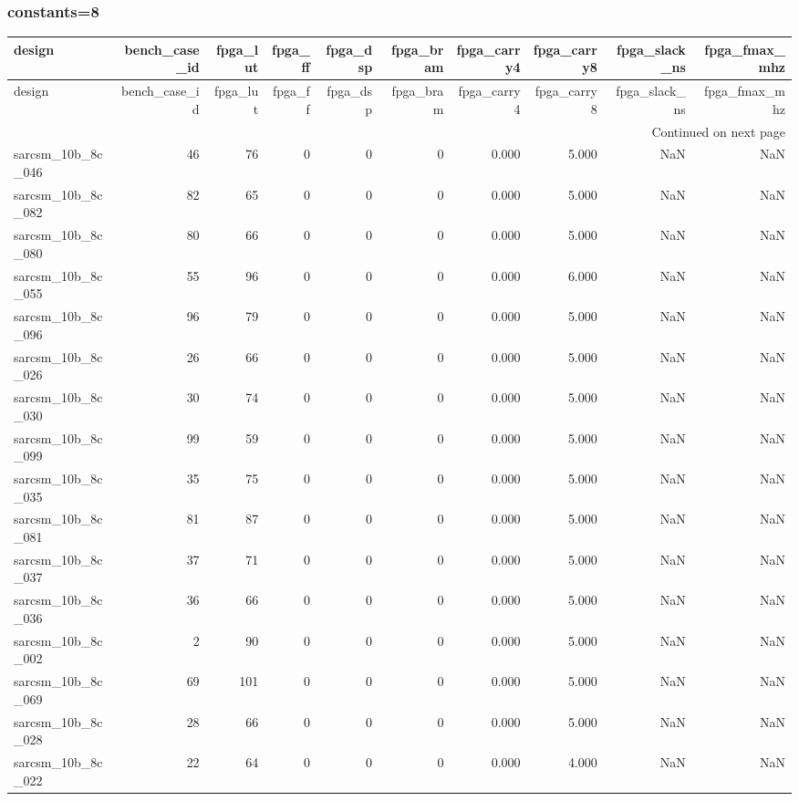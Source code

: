 \documentclass{article}
\begin{document}
\subsubsection*{constants=8}
\begin{longtable}{lrrrrrrrrr}
\toprule
design & bench\_case\_id & fpga\_lut & fpga\_ff & fpga\_dsp & fpga\_bram & fpga\_carry4 & fpga\_carry8 & fpga\_slack\_ns & fpga\_fmax\_mhz \\
\midrule
\endfirsthead
\toprule
design & bench\_case\_id & fpga\_lut & fpga\_ff & fpga\_dsp & fpga\_bram & fpga\_carry4 & fpga\_carry8 & fpga\_slack\_ns & fpga\_fmax\_mhz \\
\midrule
\endhead
\midrule
\multicolumn{10}{r}{Continued on next page} \\
\midrule
\endfoot
\bottomrule
\endlastfoot
sarcsm\_10b\_8c\_046 & 46 & 76 & 0 & 0 & 0 & 0.000 & 5.000 & NaN & NaN \\
sarcsm\_10b\_8c\_082 & 82 & 65 & 0 & 0 & 0 & 0.000 & 5.000 & NaN & NaN \\
sarcsm\_10b\_8c\_080 & 80 & 66 & 0 & 0 & 0 & 0.000 & 5.000 & NaN & NaN \\
sarcsm\_10b\_8c\_055 & 55 & 96 & 0 & 0 & 0 & 0.000 & 6.000 & NaN & NaN \\
sarcsm\_10b\_8c\_096 & 96 & 79 & 0 & 0 & 0 & 0.000 & 5.000 & NaN & NaN \\
sarcsm\_10b\_8c\_026 & 26 & 66 & 0 & 0 & 0 & 0.000 & 5.000 & NaN & NaN \\
sarcsm\_10b\_8c\_030 & 30 & 74 & 0 & 0 & 0 & 0.000 & 5.000 & NaN & NaN \\
sarcsm\_10b\_8c\_099 & 99 & 59 & 0 & 0 & 0 & 0.000 & 5.000 & NaN & NaN \\
sarcsm\_10b\_8c\_035 & 35 & 75 & 0 & 0 & 0 & 0.000 & 5.000 & NaN & NaN \\
sarcsm\_10b\_8c\_081 & 81 & 87 & 0 & 0 & 0 & 0.000 & 5.000 & NaN & NaN \\
sarcsm\_10b\_8c\_037 & 37 & 71 & 0 & 0 & 0 & 0.000 & 5.000 & NaN & NaN \\
sarcsm\_10b\_8c\_036 & 36 & 66 & 0 & 0 & 0 & 0.000 & 5.000 & NaN & NaN \\
sarcsm\_10b\_8c\_002 & 2 & 90 & 0 & 0 & 0 & 0.000 & 5.000 & NaN & NaN \\
sarcsm\_10b\_8c\_069 & 69 & 101 & 0 & 0 & 0 & 0.000 & 5.000 & NaN & NaN \\
sarcsm\_10b\_8c\_028 & 28 & 66 & 0 & 0 & 0 & 0.000 & 5.000 & NaN & NaN \\
sarcsm\_10b\_8c\_022 & 22 & 64 & 0 & 0 & 0 & 0.000 & 4.000 & NaN & NaN \\

\end{longtable}
\end{document}
